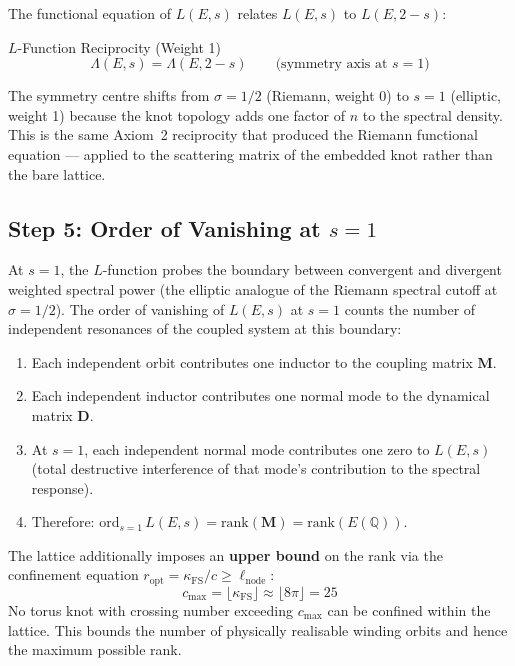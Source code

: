 The functional equation of $L(E,s)$ relates $L(E,s)$ to $L(E, 2-s)$:
\begin{resultbox}{$L$-Function Reciprocity (Weight 1)}
\begin{equation}
    \Lambda(E, s) = \Lambda(E, 2-s) \qquad \text{(symmetry axis at } s = 1\text{)}
\end{equation}
\end{resultbox}
The symmetry centre shifts from $\sigma = 1/2$ (Riemann, weight 0) to $s = 1$ (elliptic, weight 1) because the knot topology adds one factor of $n$ to the spectral density. This is the same Axiom~2 reciprocity that produced the Riemann functional equation --- applied to the scattering matrix of the embedded knot rather than the bare lattice.

\subsection{Step 5: Order of Vanishing at $s = 1$}

At $s = 1$, the $L$-function probes the boundary between convergent and divergent weighted spectral power (the elliptic analogue of the Riemann spectral cutoff at $\sigma = 1/2$). The order of vanishing of $L(E, s)$ at $s = 1$ counts the number of independent resonances of the coupled system at this boundary:

\begin{enumerate}
    \item Each independent orbit contributes one inductor to the coupling matrix $\mathbf{M}$.
    \item Each independent inductor contributes one normal mode to the dynamical matrix $\mathbf{D}$.
    \item At $s = 1$, each independent normal mode contributes one zero to $L(E,s)$ (total destructive interference of that mode's contribution to the spectral response).
    \item Therefore: $\mathrm{ord}_{s=1}\, L(E, s) = \mathrm{rank}(\mathbf{M}) = \mathrm{rank}(E(\mathbb{Q}))$.
\end{enumerate}

The lattice additionally imposes an \textbf{upper bound} on the rank via the confinement equation $r_\mathrm{opt} = \kappa_\mathrm{FS}/c \geq \ell_\mathrm{node}$:
\begin{equation}
    c_\mathrm{max} = \lfloor \kappa_\mathrm{FS} \rfloor \approx \lfloor 8\pi \rfloor = 25
\end{equation}
No torus knot with crossing number exceeding $c_\mathrm{max}$ can be confined within the lattice. This bounds the number of physically realisable winding orbits and hence the maximum possible rank.

